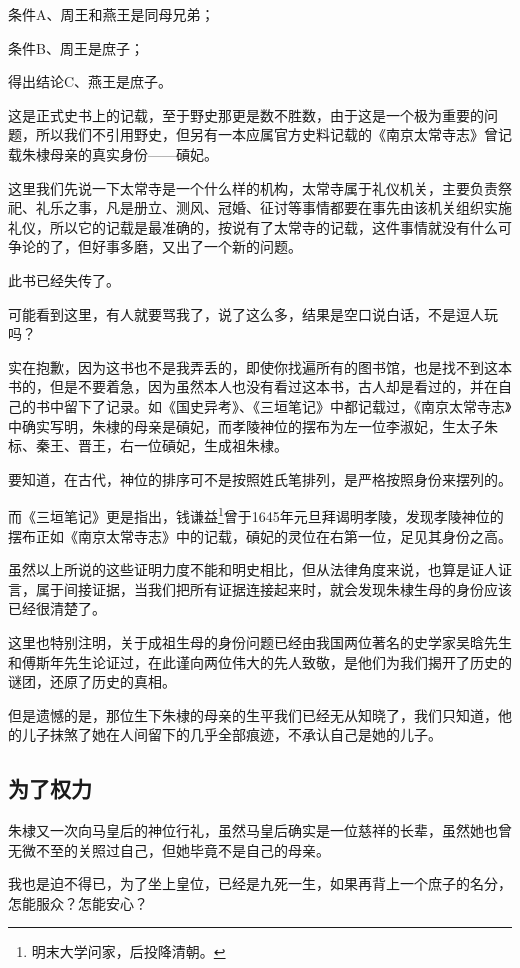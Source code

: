 \begin{multicols}{\theparacolNo}
条件A、周王和燕王是同母兄弟；

条件B、周王是庶子；

得出结论C、燕王是庶子。

这是正式史书上的记载，至于野史那更是数不胜数，由于这是一个极为重要的问题，所以我们不引用野史，但另有一本应属官方史料记载的《南京太常寺志》曾记载朱棣母亲的真实身份——碽妃。

这里我们先说一下太常寺是一个什么样的机构，太常寺属于礼仪机关，主要负责祭祀、礼乐之事，凡是册立、测风、冠婚、征讨等事情都要在事先由该机关组织实施礼仪，所以它的记载是最准确的，按说有了太常寺的记载，这件事情就没有什么可争论的了，但好事多磨，又出了一个新的问题。

此书已经失传了。

可能看到这里，有人就要骂我了，说了这么多，结果是空口说白话，不是逗人玩吗？

实在抱歉，因为这书也不是我弄丢的，即使你找遍所有的图书馆，也是找不到这本书的，但是不要着急，因为虽然本人也没有看过这本书，古人却是看过的，并在自己的书中留下了记录。如《国史异考》、《三垣笔记》中都记载过，《南京太常寺志》中确实写明，朱棣的母亲是碽妃，而孝陵神位的摆布为左一位李淑妃，生太子朱标、秦王、晋王，右一位碽妃，生成祖朱棣。

要知道，在古代，神位的排序可不是按照姓氏笔排列，是严格按照身份来摆列的。

而《三垣笔记》更是指出，钱谦益\footnote{明末大学问家，后投降清朝。}曾于1645年元旦拜谒明孝陵，发现孝陵神位的摆布正如《南京太常寺志》中的记载，碽妃的灵位在右第一位，足见其身份之高。

虽然以上所说的这些证明力度不能和明史相比，但从法律角度来说，也算是证人证言，属于间接证据，当我们把所有证据连接起来时，就会发现朱棣生母的身份应该已经很清楚了。

这里也特别注明，关于成祖生母的身份问题已经由我国两位著名的史学家吴晗先生和傅斯年先生论证过，在此谨向两位伟大的先人致敬，是他们为我们揭开了历史的谜团，还原了历史的真相。

但是遗憾的是，那位生下朱棣的母亲的生平我们已经无从知晓了，我们只知道，他的儿子抹煞了她在人间留下的几乎全部痕迹，不承认自己是她的儿子。

\subsection{为了权力}
朱棣又一次向马皇后的神位行礼，虽然马皇后确实是一位慈祥的长辈，虽然她也曾无微不至的关照过自己，但她毕竟不是自己的母亲。

我也是迫不得已，为了坐上皇位，已经是九死一生，如果再背上一个庶子的名分，怎能服众？怎能安心？


\end{multicols}
